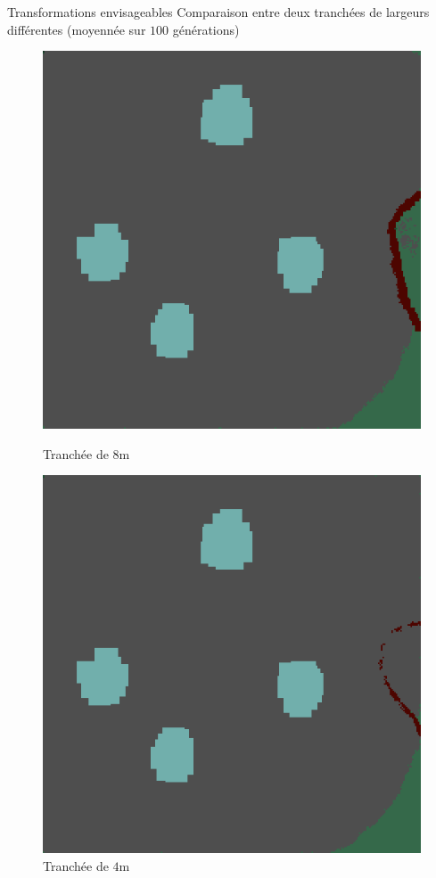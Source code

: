 \documentclass{beamer}
\begin{document}
\begin{frame}{Transformations envisageables \hyperlink{jump}{\beamerbutton{ }} \hypertarget{15}{\beamerbutton{ }}}
    Comparaison entre deux tranchées de largeurs différentes (moyennée sur $100$ générations)
    
    \begin{figure}[!htb]
        \begin{minipage}{0.48\textwidth}
          \centering
          \includegraphics[width=.8\linewidth]{pictures/trans/treach.png}
          \caption{Tranchée de $8$m}\label{Fig:Data1}
        \end{minipage}\hfill
        \begin{minipage}{0.48\textwidth}
          \centering
          \includegraphics[width=.8\linewidth]{pictures/trans/little_treach.png}
          \caption{Tranchée de $4$m}\label{Fig:Data2}
        \end{minipage}
     \end{figure}
\end{frame}
\end{document}
